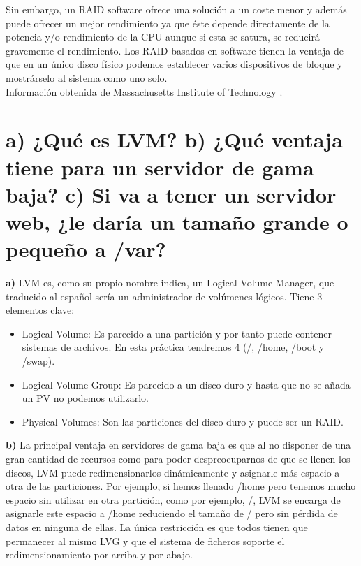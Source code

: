 Sin embargo, un RAID software ofrece una solución a un coste menor y además puede ofrecer un mejor rendimiento ya que éste depende directamente de la potencia y/o rendimiento de la CPU aunque si esta se satura, se reducirá gravemente el rendimiento. Los RAID basados en software tienen la ventaja de que en un único disco físico podemos establecer varios dispositivos de bloque y mostrárselo al sistema como uno solo. \\

Información obtenida de Massachusetts Institute of Technology \cite{mitraid}.


\section{a) ¿Qué es LVM? \newline b) ¿Qué ventaja tiene para un servidor de gama baja? \newline  c) Si va a tener un servidor web, ¿le daría un tamaño grande o pequeño a /var?}
\textbf{a)} LVM \cite{LVM} es, como su propio nombre indica, un Logical Volume Manager, que traducido al español sería un administrador de volúmenes lógicos. Tiene 3 elementos clave:\\
\begin{itemize}
	\item Logical Volume: Es parecido a una partición y por tanto puede contener sistemas de archivos. En esta práctica tendremos 4 (/, /home, /boot y /swap).
	\item Logical Volume Group: Es parecido a un disco duro y hasta que no se añada un PV no podemos utilizarlo.
	\item Physical Volumes: Son las particiones del disco duro y puede ser un RAID.
\end{itemize}


\textbf{b)} La principal ventaja en servidores de gama baja \cite{lvmlowcost} es que al no disponer de una gran cantidad de recursos como para poder despreocuparnos de que se llenen los discos, LVM puede redimensionarlos dinámicamente y asignarle más espacio a otra de las particiones. Por ejemplo, si hemos llenado /home pero tenemos mucho espacio sin utilizar en otra partición, como por ejemplo, /, LVM se encarga de asignarle este espacio a /home reduciendo el tamaño de / pero sin pérdida de datos en ninguna de ellas. La única restricción es que todos tienen que permanecer al mismo LVG y que el sistema de ficheros soporte el redimensionamiento por arriba y por abajo.\\

